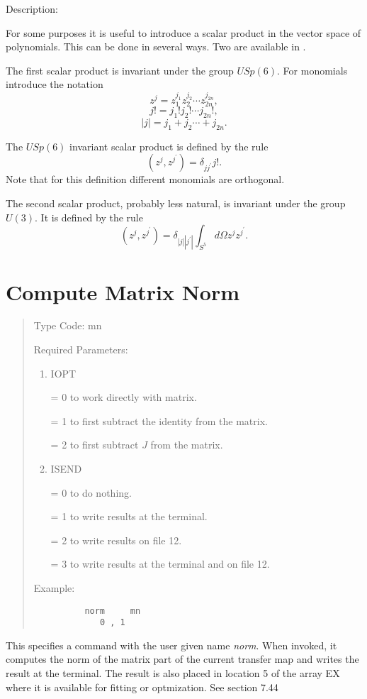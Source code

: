 \vspace{5mm}
Description:
\vspace{2mm}

For some purposes it is useful to introduce a scalar product in the vector space of polynomials.  This can be done in several ways.  Two are available in \Mary.

The first scalar product is invariant under the group $USp(6)$.  For monomials introduce the notation
\[
z^j = z_1^{j_1} z_2^{j_2} \cdots z_{2n}^{j_{2n}},
\]
\[
j! = j_1! j_2! \cdots j_{2n}!,
\]
\[
|j| = j_1+ j_2 \cdots + j_{2n}.
\]

The $USp(6)$ invariant scalar product is defined by the rule
\[
(z^j,z^{j^{\prime}}) = \delta_{jj^{\prime}} j!.
\]
Note that for this definition different monomials are orthogonal.

The second scalar product, probably less natural, is invariant under the group $U(3)$.  It is defined by the rule
\[
(z^j,z^{j^{\prime}}) = \delta_{|j||j^{\prime}|} \int_{S^5} d\Omega z^jz^{j^{\prime}}.
\]

\newpage
\section{Compute Matrix Norm}  
\begin{quotation}
\noindent Type Code:  mn
\vspace{5mm}

\noindent Required Parameters:
\begin{enumerate}
\item  IOPT

       = 0 to work directly with matrix.

       = 1 to first subtract the identity from the matrix.

       = 2 to first subtract $J$ from the matrix.

\item  ISEND

       = 0 to do nothing.

       = 1 to write results at the terminal.

       = 2 to write results on file 12.

       = 3 to write results at the terminal and on file 12.
\end{enumerate}

\vspace{5mm}
\noindent Example:
\begin{verbatim}
          norm     mn
             0 , 1
\end{verbatim}
\end{quotation}
This specifies a command with the user given name {\em norm}.  When invoked, it computes the norm of the matrix part of the current transfer map and writes the result at the terminal.  The result is also placed in location 5 of the array EX where it is available for fitting or optmization.  See section 7.44

